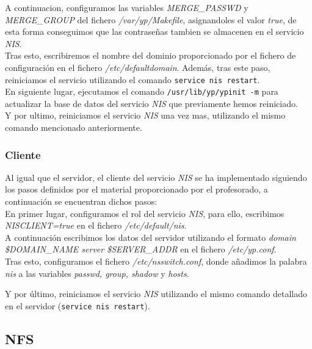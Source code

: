 \documentclass[12pt,a4paper, spanish]{article}
\begin{document}
A continuacion, configuramos las variables \textit{MERGE\_PASSWD} y \textit{MERGE\_GROUP} del fichero \textit{/var/yp/Makefile}, asignandoles el valor \textit{true}, de esta forma conseguimos que las contraseñas tambien se almacenen en el servicio \textit{NIS}.\\

Tras esto, escribiremos el nombre del dominio proporcionado por el fichero de configuración en el fichero \textit{/etc/defaultdomain}. Además, tras este paso, reiniciamos el servicio utilizando el comando \texttt{service nis restart}.\\

En siguiente lugar, ejecutamos el comando \texttt{/usr/lib/yp/ypinit -m} para actualizar la base de datos del servicio \textit{NIS} que previamente hemos reiniciado.\\

Y por ultimo, reiniciamos el servicio \textit{NIS} una vez mas, utilizando el mismo comando mencionado anteriormente.\\


\subsubsection{Cliente}
\noindent Al igual que el servidor, el cliente del servicio \textit{NIS} se ha implementado siguiendo los pasos definidos por el material proporcionado por el profesorado, a continuación se encuentran dichos pasos:\\

En primer lugar, configuramos el rol del servicio \textit{NIS}, para ello, escribimos \textit{NISCLIENT=true} en el fichero \textit{/etc/default/nis}.\\

A continuación escribimos los datos del servidor utilizando el formato \textit{domain \$DOMAIN\_NAME server \$SERVER\_ADDR} en el fichero \textit{/etc/yp.conf}.\\

Tras esto, configuramos el fichero \textit{/etc/nsswitch.conf}, donde añadimos la palabra \textit{nis} a las variables \textit{passwd, group, shadow} y \textit{hosts}.

Y por último, reiniciamos el servicio \textit{NIS} utilizando el mismo comando detallado en el servidor (\texttt{service nis restart}).\\

\subsection{NFS}
\end{document}
